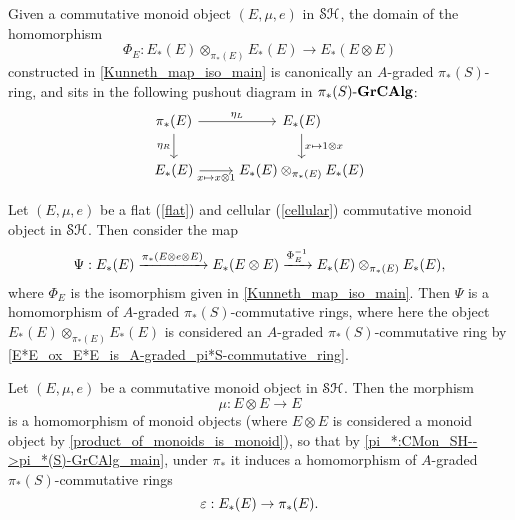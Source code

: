 \documentclass[../main.tex]{subfiles}
\begin{document}
\begin{corollary}\label{E*E_ox_E*E_is_A-graded_pi*S-commutative_ring}
    Given a %
	commutative monoid object $(E,\mu,e)$ in $\mathcal{SH}$, the domain of the %
	homomorphism
    \[\Phi_E:E_*(E)\otimes_{\pi_*(E)}E_*(E)\to E_*(E\otimes E)\]
    constructed in \autoref{Kunneth_map_iso_main} is canonically an $A$-graded $\pi_*(S)$-ring, and sits in the following pushout diagram in ${\pi_*(S)}\text-\mathbf{GrCAlg}$:
    \[\begin{tikzcd}
        {\pi_*(E)} & {E_*(E)} \\
        {E_*(E)} & {E_*(E)\otimes_{\pi_*(E)}E_*(E)}
        \arrow["{\eta_L}", from=1-1, to=1-2]
        \arrow["{\eta_R}"', from=1-1, to=2-1]
        \arrow["{x\mapsto x\otimes 1}"', from=2-1, to=2-2]
        \arrow["{x\mapsto1\otimes x}", from=1-2, to=2-2]
    \end{tikzcd}\]
\end{corollary}

\begin{proposition}\label{(E,mu,e):Psi_defn}
    Let $(E,\mu,e)$ be a flat (\autoref{flat}) and cellular (\autoref{cellular}) commutative monoid object in $\mathcal{SH}$. Then consider the map
    \[\Psi:E_*(E)\xrightarrow{\pi_*(E\otimes e\otimes E)}E_*(E\otimes E)\xrightarrow{\Phi_E^{-1}}E_*(E)\otimes_{\pi_*(E)}E_*(E),\]
    where $\Phi_E$ is the isomorphism given in \autoref{Kunneth_map_iso_main}. Then $\Psi$ is a homomorphism of $A$-graded $\pi_*(S)$-commutative rings, where here the object $E_*(E)\otimes_{\pi_*(E)}E_*(E)$ is considered an $A$-graded $\pi_*(S)$-commutative ring by \autoref{E*E_ox_E*E_is_A-graded_pi*S-commutative_ring}.
\end{proposition}

\begin{proposition}\label{(E,mu,e):vare}
    Let $(E,\mu,e)$ be a commutative monoid object in $\mathcal{SH}$. Then the morphism 
    \[\mu:E\otimes E\to E\] 
    is a homomorphism of monoid objects (where $E\otimes E$ is considered a monoid object by \autoref{product_of_monoids_is_monoid}), so that by \autoref{pi_*:CMon_SH-->pi_*(S)-GrCAlg_main}, under $\pi_*$ it induces a homomorphism of $A$-graded $\pi_*(S)$-commutative rings 
    \[\varepsilon:E_*(E)\to\pi_*(E).\]
\end{proposition}
\end{document}

